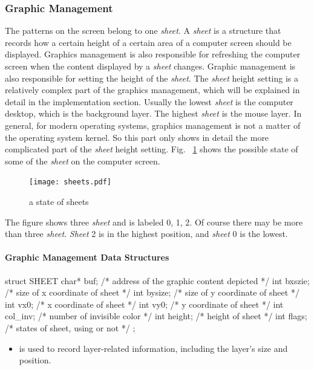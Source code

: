 \documentclass{swfcthesis}
\begin{document}
\subsubsection{Graphic Management}
\label{sec:graphic}

The patterns on the screen belong to one \emph{sheet}. A \emph{sheet} is a structure that
records how a certain height of a certain area of a computer screen should be
displayed. Graphics management is also responsible for refreshing the computer screen when
the content displayed by a \emph{sheet} changes. Graphic management is also responsible
for setting the height of the \emph{sheet}. The \emph{sheet} height setting is a relatively
complex part of the graphics management, which will be explained in detail in the
implementation section. Usually the lowest \emph{sheet} is the computer desktop, which is the
background layer. The highest \emph{sheet} is the mouse layer. In general, for modern
operating systems, graphics management is not a matter of the operating system kernel. So
this part only shows in detail the more complicated part of the \emph{sheet} height
setting. Fig. ~\ref{fig:state-sheets} shows the possible state of some of the \emph{sheet}
on the computer screen.
\begin{figure}[!ht]
  \centering
  \texttt{[image: sheets.pdf]}
  \caption{a state of sheets}
  \label{fig:state-sheets}
\end{figure}
The figure shows three \emph{sheet} and is labeled 0, 1, 2. Of course there may be more
than three \emph{sheet}. \emph{Sheet} 2 is in the highest position, and \emph{sheet} 0 is
the lowest.


  
\paragraph{Graphic Management Data Structures}

\begin{codeblock}[1]
\begin{ccode}
struct SHEET
{ 
  char* buf;   /* address of the graphic content depicted */
  int bxszie;  /* size of x coordinate of sheet */
  int bysize;  /* size of y coordinate of sheet */
  int vx0;     /* x coordinate of sheet */
  int vy0;     /* y coordinate of sheet */
  int col_inv; /* number of invisible color */
  int height;  /* height of sheet */
  int flags;   /* states of sheet, using or not */
};
\end{ccode}
\end{codeblock}
\begin{itemize}
\item is used to record layer-related information, including the layer's size and
  position.
\end{itemize}
\end{document}
